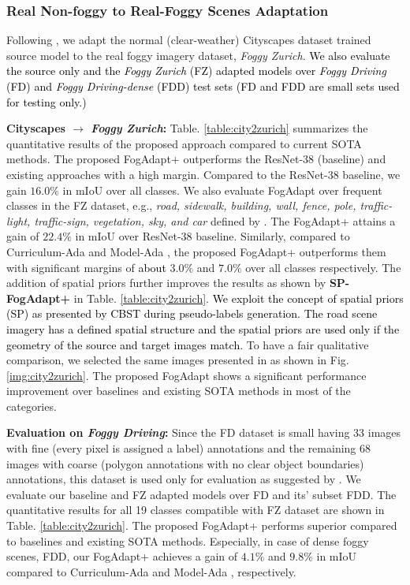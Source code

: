 \documentclass[final,5p,times,twocolumn]{elsarticle}
\begin{document}
\subsubsection{Real Non-foggy to Real-Foggy Scenes Adaptation}
Following \cite{sakaridis2018model, dai2019curriculum}, we adapt the normal (clear-weather) Cityscapes dataset trained source model to the real foggy imagery dataset, \textit{Foggy Zurich}. 
\textcolor{black}{We also evaluate the source only and the \textit{Foggy Zurich} (FZ) adapted models over \textit{Foggy Driving} (FD) and \textit{Foggy Driving-dense } (FDD) test sets (FD and FDD are small sets used for testing only.)} 


\textbf{Cityscapes $\rightarrow$ \textit{Foggy Zurich}: }
Table. \ref{table:city2zurich} summarizes the quantitative results of the proposed approach compared to current SOTA methods. The proposed FogAdapt+ outperforms the ResNet-38 (baseline) and existing approaches with a high margin. Compared to the ResNet-38 \cite{wu2019Resnet38} baseline, we gain $16.0\%$ in mIoU over all classes. We also evaluate FogAdapt over frequent classes in the FZ dataset, e.g., \textit{road, sidewalk, building, wall, fence, pole, traffic-light, traffic-sign, vegetation, sky, and car} defined by \cite{dai2019curriculum}. The FogAdapt+ attains a gain of $22.4\%$ in mIoU over ResNet-38 baseline. 
Similarly, compared to Curriculum-Ada \cite{dai2019curriculum} and Model-Ada \cite{sakaridis2018model}, the proposed FogAdapt+ outperforms them with significant margins of \textcolor{black}{about} $3.0\%$ and $7.0\%$ over all classes respectively. The addition of spatial priors further improves the results as shown by \textbf{SP-FogAdapt+} in Table. \ref{table:city2zurich}. 
\textcolor{black}{We exploit the concept of spatial priors (SP) as presented by CBST \cite{zou2018unsupervised} during pseudo-labels generation. The road scene imagery has a defined spatial structure and the spatial priors are used only if the geometry of the source and target images match. }
To have a fair qualitative comparison, we selected the same images presented in \cite{dai2019curriculum} as shown in Fig. \ref{img:city2zurich}. The proposed FogAdapt shows a significant performance improvement over baselines and existing SOTA methods in most of the categories. 

\textbf{Evaluation on \textit{Foggy Driving}: }
Since the FD dataset is small having 33 images with fine (every pixel is assigned a label)
annotations and the remaining 68 images with coarse (polygon annotations with no clear object boundaries) annotations, this dataset is used only for evaluation as suggested by \cite{sakaridis2018semantic}.  
We evaluate our baseline and FZ adapted models over FD and its' subset FDD. The quantitative results for all 19 classes compatible with FZ dataset are shown in Table. \ref{table:city2zurich}. The proposed FogAdapt+ performs superior compared to baselines and existing SOTA methods. Especially, in case of dense foggy scenes, FDD, our FogAdapt+ achieves a gain of $4.1\%$ and $9.8\%$ in mIoU compared to Curriculum-Ada \cite{dai2019curriculum} and Model-Ada \cite{sakaridis2018model}, respectively. 
\end{document}
